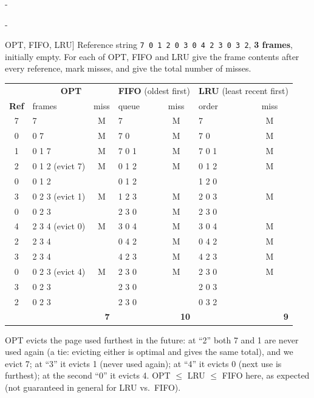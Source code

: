 \documentclass[11pt,a4paper]{article}
\makeatletter
\newcommand{\keepspace}[1]{\par\penalty-100\begingroup
  \setlength{\dimen@}{#1}\dimen@ii\pagegoal\advance\dimen@ii-\pagetotal
  \ifdim\dimen@>\dimen@ii\ifdim\dimen@ii>\z@\vfil\fi\break\fi\endgroup}
\newcounter{qn}[section]
\newcommand{\lecno}{}
\newenvironment{Qn}[2]{\refstepcounter{qn}\keepspace{8\baselineskip}%
  \begin{quizbox}[Q\lecno.\theqn\ \ [#1] #2]}{\end{quizbox}}
\newenvironment{Sol}{\begin{solbox}[Solution]}{\end{solbox}\vspace{0.4em}}
\makeatother
\begin{document}
\keepspace{24\baselineskip}
\begin{Qn}{Trace}{OPT, FIFO, LRU}
Reference string \texttt{7 0 1 2 0 3 0 4 2 3 0 3 2}, \textbf{3 frames},
initially empty. For each of OPT, FIFO and LRU give the frame contents
after every reference, mark misses, and give the total number of misses.
\end{Qn}
\begin{Sol}
\begin{center}
\small
\renewcommand{\arraystretch}{1.02}
\setlength{\tabcolsep}{4pt}
\begin{tabular}{@{}c|lc|lc|lc@{}}
  \toprule
  & \multicolumn{2}{c|}{\textbf{OPT}} & \multicolumn{2}{c|}{\textbf{FIFO} (oldest first)} & \multicolumn{2}{c}{\textbf{LRU} (least recent first)} \\
  \textbf{Ref} & frames & miss & queue & miss & order & miss \\
  \midrule
  7 & 7       & M & 7       & M & 7       & M \\
  0 & 0 7     & M & 7 0     & M & 7 0     & M \\
  1 & 0 1 7   & M & 7 0 1   & M & 7 0 1   & M \\
  2 & 0 1 2 (evict 7) & M & 0 1 2 & M & 0 1 2 & M \\
  0 & 0 1 2   &   & 0 1 2   &   & 1 2 0   &   \\
  3 & 0 2 3 (evict 1) & M & 1 2 3 & M & 2 0 3 & M \\
  0 & 0 2 3   &   & 2 3 0   & M & 2 3 0   &   \\
  4 & 2 3 4 (evict 0) & M & 3 0 4 & M & 3 0 4 & M \\
  2 & 2 3 4   &   & 0 4 2   & M & 0 4 2   & M \\
  3 & 2 3 4   &   & 4 2 3   & M & 4 2 3   & M \\
  0 & 0 2 3 (evict 4) & M & 2 3 0 & M & 2 3 0 & M \\
  3 & 0 2 3   &   & 2 3 0   &   & 2 0 3   &   \\
  2 & 0 2 3   &   & 2 3 0   &   & 0 3 2   &   \\
  \midrule
  & \multicolumn{2}{r|}{\textbf{7}} & \multicolumn{2}{r|}{\textbf{10}} & \multicolumn{2}{r}{\textbf{9}} \\
  \bottomrule
\end{tabular}
\end{center}
OPT evicts the page used furthest in the future: at ``2'' both 7 and 1
are never used again (a tie: evicting either is optimal and gives the same
total), and we evict 7; at ``3'' it evicts 1 (never used again); at ``4''
it evicts 0 (next use is furthest); at the second ``0'' it evicts 4.
OPT \(\le\) LRU \(\le\) FIFO here, as expected (not guaranteed in
general for LRU vs.\ FIFO).
\end{Sol}
\end{document}
